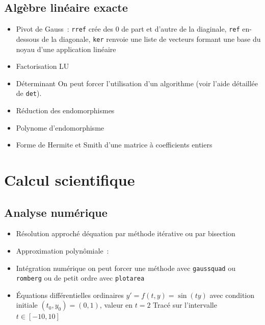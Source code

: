 \documentclass[a4paper,11pt]{book}
\begin{document}
\begin{giacjshere}
\subsection{Alg\`ebre lin\'eaire exacte}
\begin{itemize}
\item Pivot de Gauss~: \verb|rref| cr\'ee des 0 de part et d'autre
de la diaginale, \verb|ref| en-dessous de la diagonale,
\verb|ker| renvoie une liste de vecteurs formant une 
base du noyau d'une application lin\'eaire
\item Factorisation LU
\item D\'eterminant
On peut forcer l'utilisation d'un algorithme 
(voir l'aide d\'etaill\'ee de \verb|det|).
\item R\'eduction des endomorphismes
\item Polynome d'endomorphisme
\item Forme de Hermite et Smith d'une matrice \`a coefficients entiers
\end{itemize}

\section{Calcul scientifique}
\subsection{Analyse num\'erique}
\begin{itemize}
\item R\'esolution approch\'e d\'equation par m\'ethode it\'erative
ou par bisection
\item Approximation polyn\^omiale~: 
\item Int\'egration num\'erique
on peut forcer une m\'ethode avec \verb|gaussquad| ou \verb|romberg|
ou de petit ordre avec \verb|plotarea|
\item \'Equations diff\'erentielles ordinaires
$y'=f(t,y)=\sin(ty)$ 
avec condition initiale $(t_0,y_0)=(0,1)$, valeur en $t=2$
Trac\'e sur l'intervalle $t \in [-10,10]$
\end{itemize}



\end{giacjshere}
\end{document}
